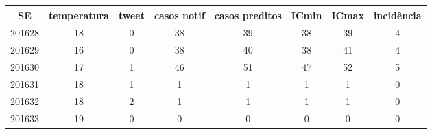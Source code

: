 \begin{tabular}{c|ccccccc}
  \hline
SE & temperatura & tweet & casos notif & casos preditos & ICmin & ICmax & incidência \\ 
  \hline
201628 & 18 & 0 & 38 & 39 & 38 & 39 & 4 \\ 
  201629 & 16 & 0 & 38 & 40 & 38 & 41 & 4 \\ 
  201630 & 17 & 1 & 46 & 51 & 47 & 52 & 5 \\ 
  201631 & 18 & 1 & 1 & 1 & 1 & 1 & 0 \\ 
  201632 & 18 & 2 & 1 & 1 & 1 & 1 & 0 \\ 
  201633 & 19 & 0 & 0 & 0 & 0 & 0 & 0 \\ 
   \hline
\end{tabular}
